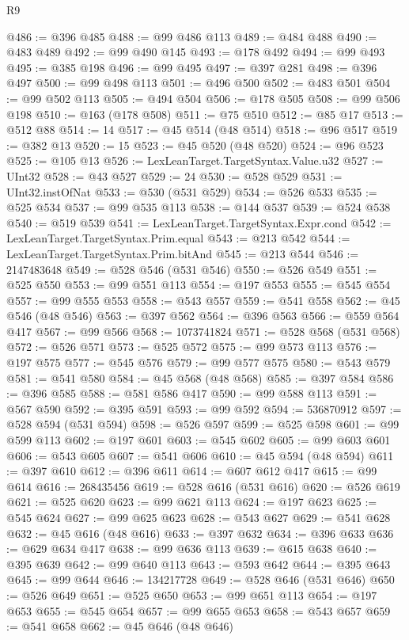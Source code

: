 \begin{lexlean}{R9}
\begin{coremodule}
@486 := @396 @485
@488 := @99 @486 @113
@489 := @484 @488
@490 := @483 @489
@492 := @99 @490 @145
@493 := @178 @492
@494 := @99 @493
@495 := @385 @198
@496 := @99 @495
@497 := @397 @281
@498 := @396 @497
@500 := @99 @498 @113
@501 := @496 @500
@502 := @483 @501
@504 := @99 @502 @113
@505 := @494 @504
@506 := @178 @505
@508 := @99 @506 @198
@510 := @163 (@178 @508)
@511 := @75 @510
@512 := @85 @17
@513 := @512 @88
@514 := 14
@517 := @45 @514 (@48 @514)
@518 := @96 @517
@519 := @382 @13
@520 := 15
@523 := @45 @520 (@48 @520)
@524 := @96 @523
@525 := @105 @13
@526 := LexLeanTarget.TargetSyntax.Value.u32
@527 := UInt32
@528 := @43 @527
@529 := 24
@530 := @528 @529
@531 := UInt32.instOfNat
@533 := @530 (@531 @529)
@534 := @526 @533
@535 := @525 @534
@537 := @99 @535 @113
@538 := @144 @537
@539 := @524 @538
@540 := @519 @539
@541 := LexLeanTarget.TargetSyntax.Expr.cond
@542 := LexLeanTarget.TargetSyntax.Prim.equal
@543 := @213 @542
@544 := LexLeanTarget.TargetSyntax.Prim.bitAnd
@545 := @213 @544
@546 := 2147483648
@549 := @528 @546 (@531 @546)
@550 := @526 @549
@551 := @525 @550
@553 := @99 @551 @113
@554 := @197 @553
@555 := @545 @554
@557 := @99 @555 @553
@558 := @543 @557
@559 := @541 @558
@562 := @45 @546 (@48 @546)
@563 := @397 @562
@564 := @396 @563
@566 := @559 @564 @417
@567 := @99 @566
@568 := 1073741824
@571 := @528 @568 (@531 @568)
@572 := @526 @571
@573 := @525 @572
@575 := @99 @573 @113
@576 := @197 @575
@577 := @545 @576
@579 := @99 @577 @575
@580 := @543 @579
@581 := @541 @580
@584 := @45 @568 (@48 @568)
@585 := @397 @584
@586 := @396 @585
@588 := @581 @586 @417
@590 := @99 @588 @113
@591 := @567 @590
@592 := @395 @591
@593 := @99 @592
@594 := 536870912
@597 := @528 @594 (@531 @594)
@598 := @526 @597
@599 := @525 @598
@601 := @99 @599 @113
@602 := @197 @601
@603 := @545 @602
@605 := @99 @603 @601
@606 := @543 @605
@607 := @541 @606
@610 := @45 @594 (@48 @594)
@611 := @397 @610
@612 := @396 @611
@614 := @607 @612 @417
@615 := @99 @614
@616 := 268435456
@619 := @528 @616 (@531 @616)
@620 := @526 @619
@621 := @525 @620
@623 := @99 @621 @113
@624 := @197 @623
@625 := @545 @624
@627 := @99 @625 @623
@628 := @543 @627
@629 := @541 @628
@632 := @45 @616 (@48 @616)
@633 := @397 @632
@634 := @396 @633
@636 := @629 @634 @417
@638 := @99 @636 @113
@639 := @615 @638
@640 := @395 @639
@642 := @99 @640 @113
@643 := @593 @642
@644 := @395 @643
@645 := @99 @644
@646 := 134217728
@649 := @528 @646 (@531 @646)
@650 := @526 @649
@651 := @525 @650
@653 := @99 @651 @113
@654 := @197 @653
@655 := @545 @654
@657 := @99 @655 @653
@658 := @543 @657
@659 := @541 @658
@662 := @45 @646 (@48 @646)

\end{coremodule}
\end{lexlean}
